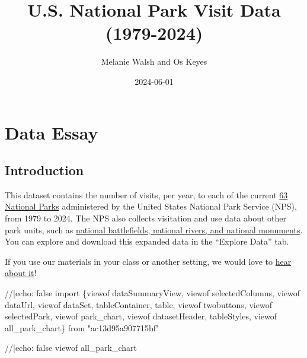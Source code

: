 \documentclass[
  letterpaper,
  DIV=11,
  numbers=noendperiod]{scrartcl}
\title{U.S. National Park Visit Data (1979-2024)}
\author{Melanie Walsh and Os Keyes}
\date{2024-06-01}
\newenvironment{Shaded}{\begin{snugshade}}{\end{snugshade}}
\newcommand{\NormalTok}[1]{\textcolor[rgb]{0.00,0.23,0.31}{#1}}
\begin{document}
\maketitle


\section{Data Essay}

\subsection{Introduction}\label{introduction}

This dataset contains the number of visits, per year, to each of the
current
\href{https://en.wikipedia.org/wiki/List_of_national_parks_of_the_United_States\#National_parks}{63
National Parks} administered by the United States National Park Service
(NPS), from 1979 to 2024. The NPS also collects visitation and use data
about other park units, such as
\href{(https://www.nps.gov/aboutus/national-park-system.htm)}{national
battlefields, national rivers, and national monuments}. You can explore
and download this expanded data in the ``Explore Data'' tab.

\begin{tcolorbox}[enhanced jigsaw, title={Brief Survey}, breakable, bottomrule=.15mm, coltitle=black, toprule=.15mm, opacitybacktitle=0.6, arc=.35mm, colback=white, leftrule=.75mm, colbacktitle=quarto-callout-tip-color!10!white, left=2mm, bottomtitle=1mm, opacityback=0, toptitle=1mm, colframe=quarto-callout-tip-color-frame, titlerule=0mm, rightrule=.15mm]

If you use our materials in your class or another setting, we would love
to \href{https://forms.gle/yJpQscUH9k9Rn4Qy9}{hear about it}!

\end{tcolorbox}

\begin{Shaded}
\begin{Highlighting}[]
\NormalTok{//|echo: false}
\NormalTok{import \{viewof dataSummaryView, viewof selectedColumns, viewof dataUrl, viewof dataSet, tableContainer, table, viewof twobuttons, viewof selectedPark, viewof park\_chart, viewof datasetHeader, tableStyles, viewof all\_park\_chart\} from "ac13d95a907715bf"}
\end{Highlighting}
\end{Shaded}

\begin{Shaded}
\begin{Highlighting}[]
\NormalTok{//|echo: false}
\NormalTok{viewof all\_park\_chart}
\end{Highlighting}
\end{Shaded}
\end{document}
